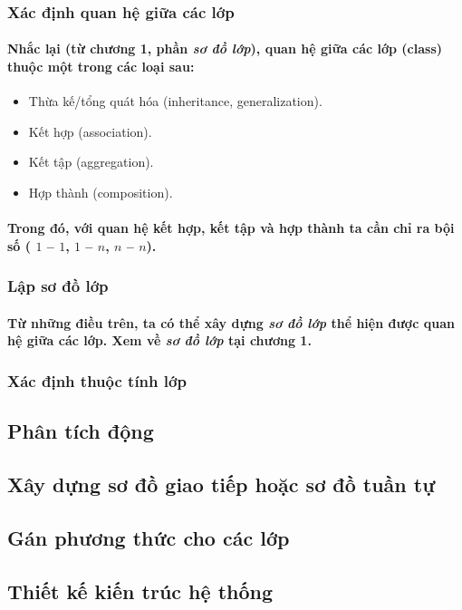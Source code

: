 \documentclass{article}
\begin{document}
    \subsubsection{Xác định quan hệ giữa các lớp}

    \paragraph{\textnormal{
      Nhắc lại (từ chương 1, phần \textit{sơ đồ lớp}), quan hệ giữa các lớp (class) thuộc một trong các loại sau:
    }}
    \begin{itemize}
      \item Thừa kế/tổng quát hóa (inheritance, generalization).
      \item Kết hợp (association).
      \item Kết tập (aggregation).
      \item Hợp thành (composition).
    \end{itemize}

    \paragraph{\textnormal{
      Trong đó, với quan hệ kết hợp, kết tập và hợp thành ta cần chỉ ra bội số ( $1$ -- $1$, $1$ -- $n$, $n$ -- $n$).
    }}

    \subsubsection{Lập sơ đồ lớp}
    
    \paragraph{\textnormal{
      Từ những điều trên, ta có thể xây dựng \textit{sơ đồ lớp} thể hiện được quan hệ giữa các lớp. Xem về \textit{sơ đồ lớp} tại chương 1.
    }}

    \subsubsection{Xác định thuộc tính lớp}

  \subsection{Phân tích động}
    \subsection{Xây dựng sơ đồ giao tiếp hoặc sơ đồ tuần tự}
    \subsection{Gán phương thức cho các lớp}

  \subsection{Thiết kế kiến trúc hệ thống}

  \subsection{}
\end{document}

